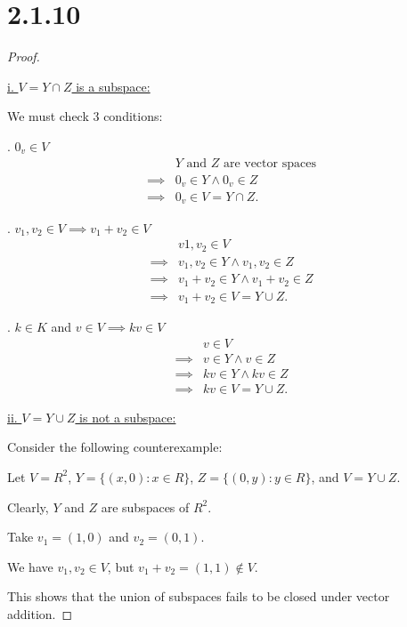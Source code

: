 \documentclass{article}
\begin{document}
\section*{2.1.10}
\begin{proof}
  $ $

  \underline{i. $V = Y \cap Z$ is a subspace:}
  \newline

  We must check 3 conditions:

  . $0_v \in V$
  \begin{align*}
    & Y \text{ and } Z \text{ are vector spaces} \\
    \implies& 0_v \in Y \land 0_v \in Z \\
    \implies& 0_v \in V=Y \cap Z.
  \end{align*}

  . $v_1, v_2 \in V \implies v_1 + v_2 \in V$
  \begin{align*}
    &v1, v_2 \in V \\
    \implies& v_1, v_2 \in Y \land v_1, v_2 \in Z \\
    \implies& v_1 + v_2 \in Y \land v_1 + v_2 \in Z \\
    \implies& v_1 + v_2 \in V = Y \cup Z.
  \end{align*}

  . $k \in K$ and $v \in V \implies kv \in V$
  \begin{align*}
    &v \in V \\
    \implies& v \in Y \land v \in Z \\
    \implies& kv \in Y \land kv \in Z \\
    \implies& kv \in V = Y \cup Z.
  \end{align*}

  \underline{ii. $V = Y \cup Z$ is not a subspace:}
  \newline

  Consider the following counterexample:

  \quad Let $V = R^2$, $Y = \{(x, 0): x \in R\}$, $Z = \{ (0, y): y\in R \}$, and $V = Y \cup Z$.

  \quad Clearly, $Y$ and $Z$ are subspaces of $R^2$.

  \quad Take $v_1 = (1, 0)$ and $v_2 = (0, 1)$.

  \quad We have $v_1, v_2 \in V$, but $v_1 + v_2 = (1, 1) \not \in V$.

  \quad This shows that the union of subspaces fails to be closed under vector addition.
  
\end{proof}
\end{document}
